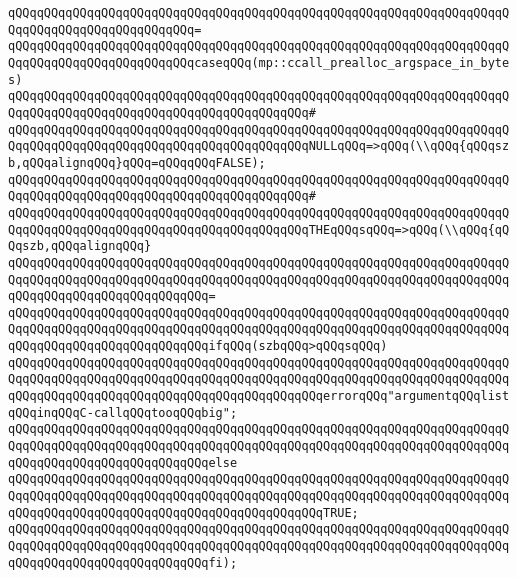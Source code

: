 \verb|qQQqqQQqqQQqqQQqqQQqqQQqqQQqqQQqqQQqqQQqqQQqqQQqqQQqqQQqqQQqqQQqqQQqqQQqqQQqqQQqqQQqqQQqqQQqqQQq=|\newline
\verb|qQQqqQQqqQQqqQQqqQQqqQQqqQQqqQQqqQQqqQQqqQQqqQQqqQQqqQQqqQQqqQQqqQQqqQQqqQQqqQQqqQQqqQQqqQQqqQQqcaseqQQq(mp::ccall_prealloc_argspace_in_bytes)|\newline
\verb|qQQqqQQqqQQqqQQqqQQqqQQqqQQqqQQqqQQqqQQqqQQqqQQqqQQqqQQqqQQqqQQqqQQqqQQqqQQqqQQqqQQqqQQqqQQqqQQqqQQqqQQqqQQqqQQq#|\newline
\verb|qQQqqQQqqQQqqQQqqQQqqQQqqQQqqQQqqQQqqQQqqQQqqQQqqQQqqQQqqQQqqQQqqQQqqQQqqQQqqQQqqQQqqQQqqQQqqQQqqQQqqQQqqQQqqQQqNULLqQQq=>qQQq(\\qQQq{qQQqszb,qQQqalignqQQq}qQQq=qQQqqQQqFALSE);|\newline
\verb|qQQqqQQqqQQqqQQqqQQqqQQqqQQqqQQqqQQqqQQqqQQqqQQqqQQqqQQqqQQqqQQqqQQqqQQqqQQqqQQqqQQqqQQqqQQqqQQqqQQqqQQqqQQqqQQq#|\newline
\verb|qQQqqQQqqQQqqQQqqQQqqQQqqQQqqQQqqQQqqQQqqQQqqQQqqQQqqQQqqQQqqQQqqQQqqQQqqQQqqQQqqQQqqQQqqQQqqQQqqQQqqQQqqQQqqQQqTHEqQQqsqQQq=>qQQq(\\qQQq{qQQqszb,qQQqalignqQQq}|\newline
\verb|qQQqqQQqqQQqqQQqqQQqqQQqqQQqqQQqqQQqqQQqqQQqqQQqqQQqqQQqqQQqqQQqqQQqqQQqqQQqqQQqqQQqqQQqqQQqqQQqqQQqqQQqqQQqqQQqqQQqqQQqqQQqqQQqqQQqqQQqqQQqqQQqqQQqqQQqqQQqqQQqqQQqqQQq=|\newline
\verb|qQQqqQQqqQQqqQQqqQQqqQQqqQQqqQQqqQQqqQQqqQQqqQQqqQQqqQQqqQQqqQQqqQQqqQQqqQQqqQQqqQQqqQQqqQQqqQQqqQQqqQQqqQQqqQQqqQQqqQQqqQQqqQQqqQQqqQQqqQQqqQQqqQQqqQQqqQQqqQQqqQQqqQQqifqQQq(szbqQQq>qQQqsqQQq)|\newline
\verb|qQQqqQQqqQQqqQQqqQQqqQQqqQQqqQQqqQQqqQQqqQQqqQQqqQQqqQQqqQQqqQQqqQQqqQQqqQQqqQQqqQQqqQQqqQQqqQQqqQQqqQQqqQQqqQQqqQQqqQQqqQQqqQQqqQQqqQQqqQQqqQQqqQQqqQQqqQQqqQQqqQQqqQQqqQQqqQQqqQQqqQQqerrorqQQq"argumentqQQqlistqQQqinqQQqC-callqQQqtooqQQqbig";|\newline
\verb|qQQqqQQqqQQqqQQqqQQqqQQqqQQqqQQqqQQqqQQqqQQqqQQqqQQqqQQqqQQqqQQqqQQqqQQqqQQqqQQqqQQqqQQqqQQqqQQqqQQqqQQqqQQqqQQqqQQqqQQqqQQqqQQqqQQqqQQqqQQqqQQqqQQqqQQqqQQqqQQqqQQqqQQqelse|\newline
\verb|qQQqqQQqqQQqqQQqqQQqqQQqqQQqqQQqqQQqqQQqqQQqqQQqqQQqqQQqqQQqqQQqqQQqqQQqqQQqqQQqqQQqqQQqqQQqqQQqqQQqqQQqqQQqqQQqqQQqqQQqqQQqqQQqqQQqqQQqqQQqqQQqqQQqqQQqqQQqqQQqqQQqqQQqqQQqqQQqqQQqqQQqTRUE;|\newline
\verb|qQQqqQQqqQQqqQQqqQQqqQQqqQQqqQQqqQQqqQQqqQQqqQQqqQQqqQQqqQQqqQQqqQQqqQQqqQQqqQQqqQQqqQQqqQQqqQQqqQQqqQQqqQQqqQQqqQQqqQQqqQQqqQQqqQQqqQQqqQQqqQQqqQQqqQQqqQQqqQQqqQQqqQQqfi);|\newline
